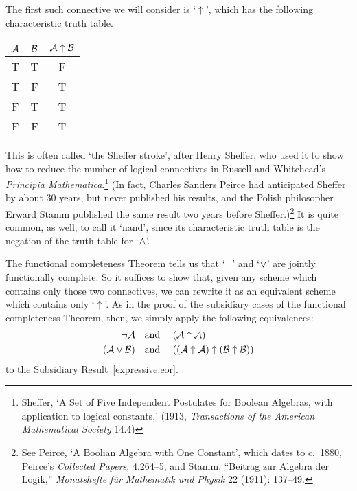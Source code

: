 The first such connective we will consider is `$\uparrow$', which has the following characteristic truth table.
\begin{center}
\begin{tabular}{c c | c}
$\mathcal{A}$ & $\mathcal{B}$ & $\mathcal{A} \mathrel{\uparrow} \mathcal{B}$\\
\hline
 T & T & F \\
 T & F & T \\
 F & T & T  \\
 F & F & T
\end{tabular}
\end{center}
 This is often called `the Sheffer stroke', after Henry Sheffer, who used it to show how to reduce the number of logical connectives in Russell and Whitehead's \emph{Principia Mathematica}.\footnote{Sheffer, `A Set of Five Independent Postulates for Boolean Algebras, with application to logical constants,' (1913, \emph{Transactions of the American Mathematical Society} 14.4)} (In fact, Charles Sanders Peirce had anticipated Sheffer by about 30 years, but never published his results, and the Polish philosopher Erward Stamm published the same result two years before Sheffer.)\footnote{See Peirce, `A Boolian Algebra with One Constant', which dates to c.~1880, Peirce's \emph{Collected Papers}, 4.264--5, and Stamm, ``Beitrag zur Algebra der Logik,'' \emph{Monatshefte für Mathematik und Physik} 22 (1911): 137--49.} It is quite common, as well, to call it `nand', since its characteristic truth table is the negation of the truth table for `$\wedge$'.

The functional completeness Theorem tells us that `$\neg$' and `$\vee$' are jointly functionally complete. So it suffices to show that, given any scheme which contains only those two connectives, we can rewrite it as an equivalent scheme which contains only `$\uparrow$'. As in the proof of the subsidiary cases of the functional completeness Theorem, then, we simply apply the following equivalences:
		\begin{align*}
			\neg \mathcal{A} &\text{\quad and \quad} (\mathcal{A} \uparrow \mathcal{A})\\
			(\mathcal{A} \vee \mathcal{B}) & \text{\quad and \quad} ((\mathcal{A} \uparrow \mathcal{A}) \uparrow (\mathcal{B} \uparrow \mathcal{B}))
		\end{align*}
to the Subsidiary Result~\ref{expressive:eor}.

